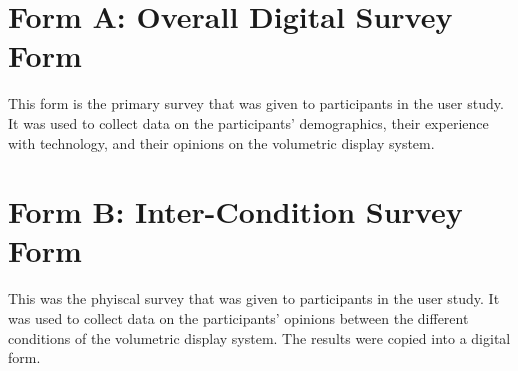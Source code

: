 \section{Form A: Overall Digital Survey Form}
This form is the primary survey that was given to participants in the user study. It was used to collect data on the participants' demographics, their experience with technology, and their opinions on the volumetric display system.



\section{Form B: Inter-Condition Survey Form}
This was the phyiscal survey that was given to participants in the user study. It was used to collect data on the participants' opinions between the different conditions of the volumetric display system. The results were copied into a digital form. 

